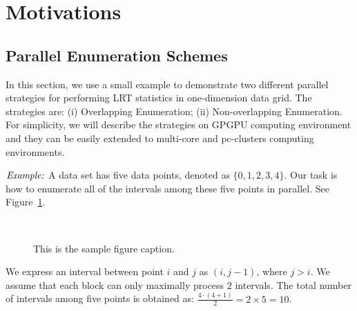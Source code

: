\documentclass[AMA,LATO1COL]{WileyNJD-v2}
\begin{document}
\section{Motivations}
\label{sec:mov}

\subsection{Parallel Enumeration Schemes}
\label{sec:mov1}
In this section, we use a small example to demonstrate two different parallel strategies for performing LRT statistics in one-dimension data grid. The strategies are: (i) Overlapping Enumeration; (ii) Non-overlapping Enumeration. For simplicity, we will describe the strategies on GPGPU computing environment and they can be easily extended to multi-core and pc-clusters computing environments.

$\noindent \textit {Example:}$  A data set has five data points, denoted as $\{0,1,2,3,4\}$. Our task is how to enumerate all of the intervals among these five points in parallel. See Figure~\ref{example1}.

\begin{figure}[t]
\centering
{}
~~\\
\caption{This is the sample figure caption.\label{example1}}
\end{figure}

 We express an interval between point $i$ and $j$ as $(i,j-1)$, where $j > i$. We assume that each block can only maximally process $2$ intervals. The total number of intervals among five points is obtained as: ${\frac{4 \cdot (4+1)}{2}}=2\times 5=10$.
\end{document}
